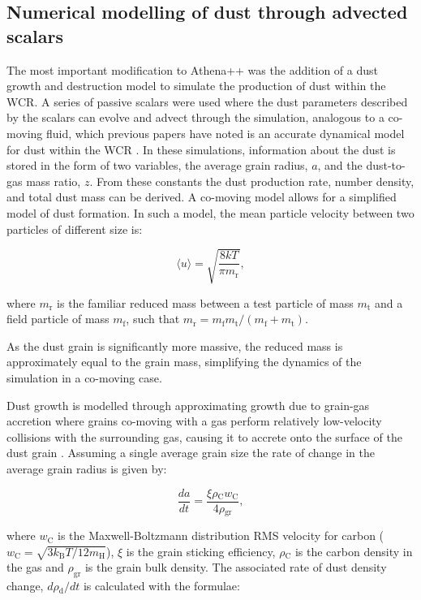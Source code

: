 \documentclass[fleqn,usenatbib]{mnras}
\newcommand{\rms}[1]{\ensuremath{_{\text{#1}}}}
\begin{document}
\subsection{Numerical modelling of dust through advected scalars}

The most important modification to Athena++ was the addition of a dust growth and destruction model to simulate the production of dust within the WCR.
A series of passive scalars were used where the dust parameters described by the scalars can evolve and advect through the simulation, analogous to a co-moving fluid, which previous papers have noted is an accurate dynamical model for dust within the WCR \citep{hendrix_pinwheels_2016}.
In these simulations, information about the dust is stored in the form of two variables, the average grain radius, $a$, and the dust-to-gas mass ratio, $z$.
From these constants the dust production rate, number density, and total dust mass can be derived.
A co-moving model allows for a simplified model of dust formation. In such a model, the mean particle velocity between two particles of different size is:

\begin{equation}
  \langle u \rangle = \sqrt{\frac{8kT}{\pi m \rms r}} ,
\end{equation}

\noindent
where $m \rms r$ is the familiar reduced mass between a test particle of mass $m \rms t$ and a field particle of mass $m \rms f$, such that $m \rms r = m \rms f m \rms t / (m \rms f + m \rms t)$.

\noindent
As the dust grain is significantly more massive, the reduced mass is approximately equal to the grain mass, simplifying the dynamics of the simulation in a co-moving case.

Dust growth is modelled through approximating growth due to grain-gas accretion where grains co-moving with a gas perform relatively low-velocity collisions with the surrounding gas, causing it to accrete onto the surface of the dust grain 
\citep{spitzer_jr._physical_2008}.
Assuming a single average grain size the rate of change in the average grain radius is given by:

\begin{equation}
  \frac{da}{dt} = \frac{\xi \rho\rms{C} w_\text{C}}{4 \rho\rms{gr}} ,
\end{equation}

\noindent
where $w\rms{C}$ is the Maxwell-Boltzmann distribution RMS velocity for carbon ($w\rms{C} = \sqrt{3 k\rms{B} T/12 m\rms{H}}$), $\xi$ is the grain sticking efficiency, $\rho\rms{C}$ is the carbon density in the gas and $\rho_\text{gr}$ is the grain bulk density.
The associated rate of dust density change, $d\rho\rms{d}/dt$ is calculated with the formulae:
\end{document}
